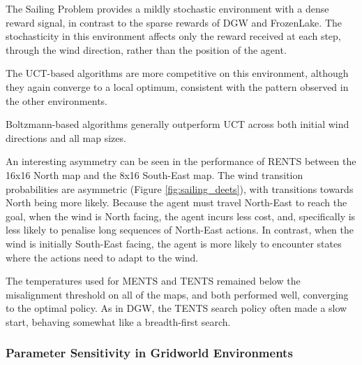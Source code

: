    The Sailing Problem provides a mildly stochastic 
    environment with a dense reward signal, in contrast to 
    the sparse rewards of DGW and FrozenLake. The 
    stochasticity in this environment affects only the 
    reward received at each step, through the wind 
    direction, rather than the position of the agent. 

    The UCT-based algorithms are more competitive on this environment, although they again converge to a local optimum, 
    consistent with the pattern observed in the other 
    environments. 

    Boltzmann-based algorithms generally outperform UCT 
    across both initial wind directions and all map sizes. 

    An interesting asymmetry can be seen in the performance of RENTS between the 16x16 North map and the 8x16 South-East map. The wind transition probabilities are asymmetric (Figure \ref{fig:sailing_deets}), with transitions towards North being more likely. Because the agent must travel North-East to reach the goal, when the wind is North facing, the agent incurs less cost, and, specifically is less likely to penalise long sequences of North-East actions. In contrast, when the wind is initially South-East facing, the agent is more likely to encounter states where the actions need to adapt to the wind.

    The temperatures used for MENTS and TENTS remained below the misalignment threshold on all of the maps, and both performed well, converging to the optimal policy. As in DGW, the TENTS search policy often made a slow start, behaving somewhat like a breadth-first search.

    


    







\subsubsection{Parameter Sensitivity in Gridworld Environments}
\label{sec:4-4-3-2-param_sens_fl}

